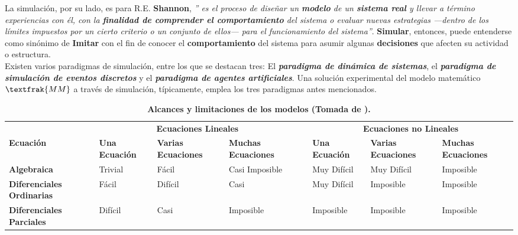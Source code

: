 La simulación, por su lado, es para R.E. \textbf{Shannon}, \textit{” es el proceso de diseñar un \textbf{modelo} de un \textbf{sistema real} y llevar a término experiencias con él, con la \textbf{finalidad de comprender el comportamiento} del sistema o evaluar nuevas estrategias —dentro de los límites impuestos por un cierto criterio o un conjunto de ellos— para el funcionamiento del sistema”}. \textbf{Simular}, entonces, puede entenderse como sinónimo de \textbf{Imitar} con el fin de conocer el \textbf{comportamiento} del sistema para asumir algunas \textbf{decisiones} que afecten su actividad o estructura.\\

Existen varios paradigmas de simulación, entre los que se destacan tres: El \textbf{\textit{paradigma de dinámica de sistemas}}, el \textbf{\textit{paradigma de simulación de eventos discretos}} y el \textbf{\textit{paradigma de agentes artificiales}}. Una solución experimental del modelo matemático $\textfrak{MM}$ a través de simulación, típicamente, emplea los tres paradigmas antes mencionados.\\

\begin{table}[H]
\centering
\begin{tabular}{|p{2.2cm}|p{1.4cm}|p{1.4cm}|p{1.4cm}|p{0.1cm}|p{1.4cm}|p{1.4cm}|p{1.4cm}|}

                                  & \multicolumn{3}{c|}{\textbf{Ecuaciones Lineales}}                               & \multirow{}{}{} & \multicolumn{3}{c|}{\textbf{Ecuaciones no Lineales}}                            \\ \cline{1-4} \cline{6-8} 
\textbf{Ecuación}                 & \textbf{Una Ecuación} & \textbf{Varias Ecuaciones} & \textbf{Muchas Ecuaciones} &                   & \textbf{Una Ecuación} & \textbf{Varias Ecuaciones} & \textbf{Muchas Ecuaciones} \\ \cline{1-4} \cline{6-8} 
\textbf{Algebraica}               & Trivial               & Fácil                      & Casi Imposible             &                   & Muy Difícil           & Muy Difícil                & Imposible                  \\ \cline{1-4} \cline{6-8} 
\textbf{Diferenciales Ordinarias} & Fácil                 & Difícil                    & Casi                       &                   & Muy Difícil           & Imposible                  & Imposible                  \\ \cline{1-4} \cline{6-8} 
\textbf{Diferenciales Parciales}  & Difícil               & Casi                       & Imposible                  &                   & Imposible             & Imposible                  & Imposible                  \\ 
\end{tabular}
\caption{\textbf{Alcances y limitaciones de los modelos (Tomada de \cite{bertalanffy1968systemTheory}).}}
\label{tab:alcanLimitModelosVonBertalanffy}
\end{table}
